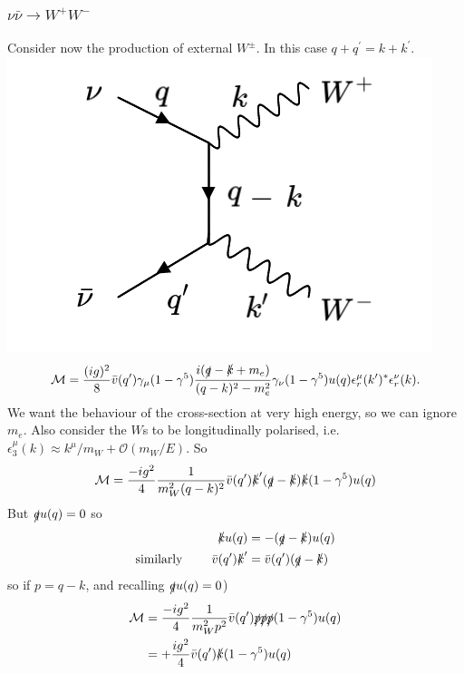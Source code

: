 \subsubsection{$\nu \bar{\nu} \to W^+ W^-$}
%
Consider now the production of external $W^\pm$. In this case $q + q^\prime = k + k^\prime$. 
\newline
%
  \includegraphics[width=0.4\linewidth]{figs/18a.png}
%
\begin{equation}
\mathcal{M} = \frac{(ig)^2}{8} \bar{v}(q^\prime) \gamma_\mu(1-\gamma^5)\frac{i(\slashed{q}-\slashed{k}+m_e)}{(q-k)^2 -m_e^2}\gamma_\nu(1-\gamma^5)u(q)\epsilon_r^\mu(k^\prime)^* \epsilon_r^\nu(k).
\end{equation}
We want the behaviour of the cross-section at very high energy, so we can ignore $m_e$. Also consider the $W$s to be longitudinally polarised, i.e. $\epsilon_3^\mu(k) \approx k^\mu/m_W + \mathcal{O}(m_W/E)$. So
\begin{equation}
\mathcal{M} = \frac{-ig^2}{4}\frac{1}{m_W^2(q-k)^2}\bar{v}(q^\prime)\slashed{k}^\prime(\slashed{q}-\slashed{k})\slashed{k}(1-\gamma^5)u(q)
\end{equation}
But $\slashed{q}u(q)=0$ so 
\begin{equation}
\begin{split}
\slashed{k}u(q) &= - (\slashed{q}-\slashed{k})u(q) \\
\text{similarly } \qquad \bar{v}(q^\prime)\slashed{k}^\prime &= \bar{v}(q^\prime)(\slashed{q}-\slashed{k})
\end{split}
\end{equation}
so if $p = q -k$, and recalling $\slashed{q}u(q)=0$)
\begin{equation}
\begin{split}
\mathcal{M} &= \frac{-ig^2}{4}\frac{1}{m_W^2p^2}\bar{v}(q^\prime)\slashed{p}\slashed{p}\slashed{p}(1-\gamma^5)u(q) \\
&= +\frac{ig^2}{4}\bar{v}(q^\prime)\slashed{k}(1-\gamma^5)u(q)
\end{split}
\end{equation}
